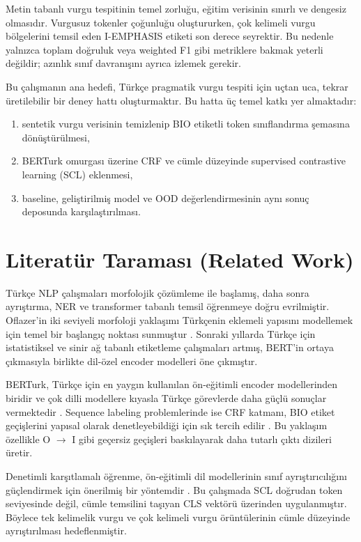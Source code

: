 \documentclass[conference]{IEEEtran}
\begin{document}
Metin tabanlı vurgu tespitinin temel zorluğu, eğitim verisinin sınırlı ve dengesiz olmasıdır. Vurgusuz tokenler çoğunluğu oluştururken, çok kelimeli vurgu bölgelerini temsil eden I-EMPHASIS etiketi son derece seyrektir. Bu nedenle yalnızca toplam doğruluk veya weighted F1 gibi metriklere bakmak yeterli değildir; azınlık sınıf davranışını ayrıca izlemek gerekir.

Bu çalışmanın ana hedefi, Türkçe pragmatik vurgu tespiti için uçtan uca, tekrar üretilebilir bir deney hattı oluşturmaktır. Bu hatta üç temel katkı yer almaktadır:
\begin{enumerate}
    \item sentetik vurgu verisinin temizlenip BIO etiketli token sınıflandırma şemasına dönüştürülmesi,
    \item BERTurk omurgası üzerine CRF ve cümle düzeyinde supervised contrastive learning (SCL) eklenmesi,
    \item baseline, geliştirilmiş model ve OOD değerlendirmesinin aynı sonuç deposunda karşılaştırılması.
\end{enumerate}

\section{Literatür Taraması (Related Work)}
Türkçe NLP çalışmaları morfolojik çözümleme ile başlamış, daha sonra ayrıştırma, NER ve transformer tabanlı temsil öğrenmeye doğru evrilmiştir. Oflazer'in iki seviyeli morfoloji yaklaşımı Türkçenin eklemeli yapısını modellemek için temel bir başlangıç noktası sunmuştur \cite{oflazer1994}. Sonraki yıllarda Türkçe için istatistiksel ve sinir ağ tabanlı etiketleme çalışmaları artmış, BERT'in ortaya çıkmasıyla birlikte dil-özel encoder modelleri öne çıkmıştır.

BERTurk, Türkçe için en yaygın kullanılan ön-eğitimli encoder modellerinden biridir ve çok dilli modellere kıyasla Türkçe görevlerde daha güçlü sonuçlar vermektedir \cite{stefanit}. Sequence labeling problemlerinde ise CRF katmanı, BIO etiket geçişlerini yapısal olarak denetleyebildiği için sık tercih edilir \cite{crfner}. Bu yaklaşım özellikle O $\rightarrow$ I gibi geçersiz geçişleri baskılayarak daha tutarlı çıktı dizileri üretir.

Denetimli karşıtlamalı öğrenme, ön-eğitimli dil modellerinin sınıf ayrıştırıcılığını güçlendirmek için önerilmiş bir yöntemdir \cite{gunel2021}. Bu çalışmada SCL doğrudan token seviyesinde değil, cümle temsilini taşıyan CLS vektörü üzerinden uygulanmıştır. Böylece tek kelimelik vurgu ve çok kelimeli vurgu örüntülerinin cümle düzeyinde ayrıştırılması hedeflenmiştir.
\end{document}
